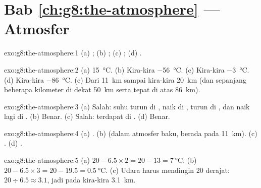 \section*{Bab \ref{ch:g8:the-atmosphere} --- Atmosfer}

\begin{solution}{exo:g8:the-atmosphere:1}
(a) ; (b) ; (c) ; (d) .
\end{solution}

\begin{solution}{exo:g8:the-atmosphere:2}
(a) \qty{15}{\degreeCelsius}. (b) Kira-kira \qty{-56}{\degreeCelsius}.
(c) Kira-kira \qty{-3}{\degreeCelsius}. (d) Kira-kira
\qty{-86}{\degreeCelsius}. (e) Dari \qty{11}{km} sampai kira-kira
\qty{20}{km} (dan sepanjang beberapa kilometer di dekat \qty{50}{km} serta
tepat di atas \qty{86}{km}).
\end{solution}

\begin{solution}{exo:g8:the-atmosphere:3}
(a) Salah: suhu turun di , naik di , turun di ,
dan naik lagi di . (b) Benar. (c) Salah:  terdapat di
. (d) Benar.
\end{solution}

\begin{solution}{exo:g8:the-atmosphere:4}
(a) . (b)  (dalam atmosfer baku,  berada pada
\qty{11}{km}). (c) . (d) .
\end{solution}

\begin{solution}{exo:g8:the-atmosphere:5}
(a) $20 - 6.5 \times 2 = 20 - 13 = \qty{7}{\degreeCelsius}$. (b) $20 -
6.5 \times 3 = 20 - 19.5 = \qty{0.5}{\degreeCelsius}$. (c) Udara harus
mendingin 20 derajat: $20 \div 6.5 \approx 3.1$, jadi pada kira-kira
\qty{3.1}{km}.
\end{solution}

